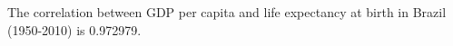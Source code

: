 
The correlation between GDP per capita and life expectancy at birth in Brazil (1950-2010) is 0.972979.


